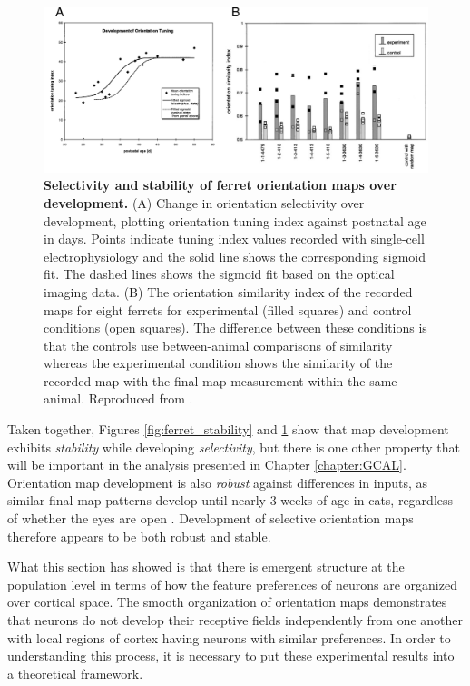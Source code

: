 \documentclass[phd,ianc,twoside]{infthesis}
\begin{document}
\begin{figure}
\center
\includegraphics[width=1.0\textwidth]{./figures/chapman_data.pdf}
\caption{{\bf Selectivity and stability of ferret orientation maps over
    development.} (A) Change in orientation selectivity over
  development, plotting orientation tuning index against postnatal age
  in days. Points indicate tuning index values recorded with single-cell
  electrophysiology and the solid line shows the corresponding sigmoid
  fit. The dashed lines shows the sigmoid fit based on the optical
  imaging data. (B) The orientation similarity index of the recorded
  maps for eight ferrets for experimental (filled squares) and control
  conditions (open squares). The difference between these conditions is
  that the controls use between-animal comparisons of similarity whereas
  the experimental condition shows the similarity of the recorded map
  with the final map measurement within the same animal. Reproduced from
  \citet{chapman_jn96}.}
\label{fig:chapman_data}
\end{figure}

Taken together, Figures \ref{fig:ferret_stability} and
\ref{fig:chapman_data} show that map development exhibits
\emph{stability} while developing \emph{selectivity}, but
there is one other property that will be important in the analysis
presented in Chapter \ref{chapter:GCAL}. Orientation map development is
also \emph{robust} against differences in inputs, as similar final map
patterns develop until nearly 3 weeks of age in cats, regardless of
whether the eyes are open \citep{crair_science98}. Development of
selective orientation maps therefore appears to be both robust and
stable.


What this section has showed is that there is emergent structure at the
population level in terms of how the feature preferences of neurons are
organized over cortical space. The smooth organization of orientation
maps demonstrates that neurons do not develop their receptive fields
independently from one another with local regions of cortex having
neurons with similar preferences. In order to understanding this
process, it is necessary to put these experimental results into a
theoretical framework.
\end{document}

